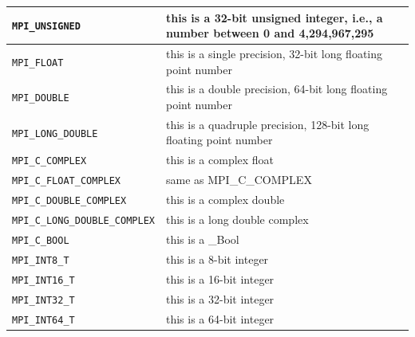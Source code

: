 \documentclass{../../template/esiwace-report}
\begin{document}
\begin{longtable}{|>{\centering\arraybackslash} m{5.5cm} | >{\centering\arraybackslash} m{6cm} |}
        \small \texttt{MPI\_UNSIGNED}                 & \small this is a 32-bit unsigned integer, i.e., a number between 0 and 4,294,967,295          \\ \hline
        \small \texttt{MPI\_FLOAT}                    & \small this is a single precision, 32-bit long floating point number                          \\ \hline
        \small \texttt{MPI\_DOUBLE}                   & \small this is a double precision, 64-bit long floating point number                          \\ \hline
        \small \texttt{MPI\_LONG\_DOUBLE}             & \small this is a quadruple precision, 128-bit long floating point number                      \\ \hline
        \small \texttt{MPI\_C\_COMPLEX}               & \small this is a complex float                                                                \\ \hline
        \small \texttt{MPI\_C\_FLOAT\_COMPLEX}        & \small same as MPI\_C\_COMPLEX                                                                \\ \hline
        \small \texttt{MPI\_C\_DOUBLE\_COMPLEX}       & \small this is a complex double                                                               \\ \hline
        \small \texttt{MPI\_C\_LONG\_DOUBLE\_COMPLEX} & \small this is a long double complex                                                          \\ \hline
        \small \texttt{MPI\_C\_BOOL}                  & \small this is a \_Bool                                                                       \\ \hline
        \small \texttt{MPI\_INT8\_T}                  & \small this is a 8-bit integer                                                                \\ \hline
        \small \texttt{MPI\_INT16\_T}                 & \small this is a 16-bit integer                                                               \\ \hline
        \small \texttt{MPI\_INT32\_T}                 & \small this is a 32-bit integer                                                               \\ \hline
        \small \texttt{MPI\_INT64\_T}                 & \small this is a 64-bit integer                                                               \\ \hline

\end{longtable}
\end{document}

